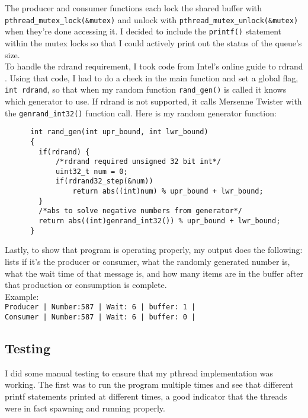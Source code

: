 \documentclass[10pt,letterpaper]{article}
\begin{document}
    \noindent The producer and consumer functions each lock the shared buffer
    with \texttt{pthread\_mutex\_lock(\&mutex)} and unlock with
    \texttt{pthread\_mutex\_unlock(\&mutex)} when they're done accessing it.
    I decided to include the \texttt{printf()} statement within the mutex locks
    so that I could actively print out the status of the queue's size.\\

    \noindent To handle the rdrand requirement, I took code from Intel's online
    guide to rdrand \cite{johnm.2014}. Using that code, I had to do a check in
    the main function and set a global flag, \texttt{int rdrand}, so that when
    my random function \texttt{rand\_gen()} is called it knows which generator
    to use. If rdrand is not supported, it calls Mersenne Twister with the
    \texttt{genrand\_int32()} function call. Here is my random generator function:

    \begin{lstlisting}
      int rand_gen(int upr_bound, int lwr_bound)
      {
      	if(rdrand) {
      		/*rdrand required unsigned 32 bit int*/
      		uint32_t num = 0;
      		if(rdrand32_step(&num))
      			return abs((int)num) % upr_bound + lwr_bound;
      	}
      	/*abs to solve negative numbers from generator*/
      	return abs((int)genrand_int32()) % upr_bound + lwr_bound;
      }
    \end{lstlisting}

    \noindent Lastly, to show that program is operating properly, my output does
    the following: lists if it's the producer or consumer, what the randomly
    generated number is, what the wait time of that message is, and how many items
    are in the buffer after that production or consumption is complete. \\

    \noindent Example: \\

    \noindent \texttt{Producer | Number:587 | Wait: 6 | buffer:  1 |} \\
    \texttt{Consumer | Number:587 | Wait: 6 | buffer:  0 |}

  \subsection{Testing}
  I did some manual testing to ensure that my pthread implementation was working.
  The first was to run the program multiple times and see that different printf
  statements printed at different times, a good indicator that the threads were
  in fact spawning and running properly. \\
\end{document}
